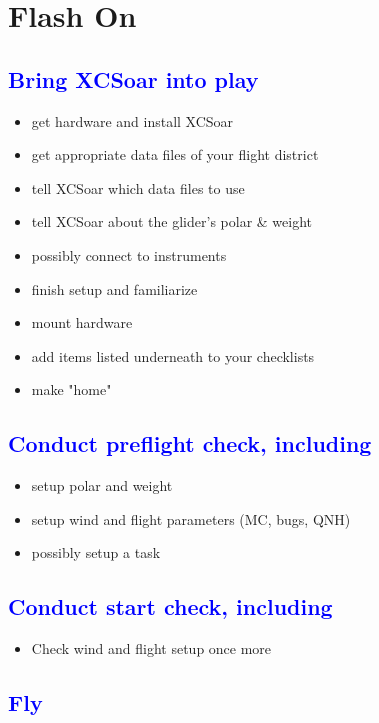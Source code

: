 \section*{Flash {\color[rgb]{.9,.85,0}On}}\label{ch:flashon}

\subsection{\textcolor{blue}{Bring XCSoar into play}}
\begin{itemize}
\item get hardware and install XCSoar
\item get appropriate data files of your flight district
\item tell XCSoar which data files to use
\item tell XCSoar about the glider's polar \& weight
\item possibly connect to instruments
\item finish setup and familiarize
\item mount hardware
\item add items listed underneath to your checklists
\item make "home"
\end{itemize}

\subsection{\textcolor{blue}{Conduct preflight check, including}}
\begin{itemize}
\item setup polar and weight
\item setup wind and flight parameters (MC, bugs, QNH)
\item possibly setup a task
\end{itemize}

\subsection{\textcolor{blue}{Conduct start check, including}}
\begin{itemize}
\item Check wind and flight setup once more
\end{itemize}

\subsection{\textcolor{blue}{Fly}}
\vspace{1em}

